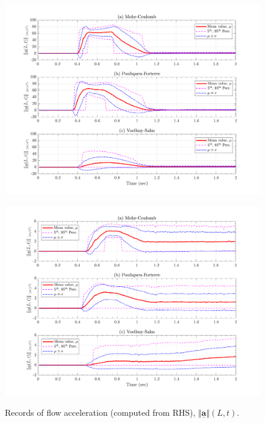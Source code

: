 \documentclass{article}
\begin{document}
\begin{figure}[H]
	\begin{minipage}[b]{0.5\linewidth}
    	\centering
    	\includegraphics[width=1\textwidth]{InclinedPlane/LocalRecords/Records/accel_L3R.png}
    	\label{fig:Ramp-L3-AccR}
	\end{minipage}
	\begin{minipage}[b]{0.5\linewidth}
		\centering
		\includegraphics[width=1\textwidth]{InclinedPlane/LocalRecords/Records/accel_L4R.png}
    	\label{fig:Ramp-L4-AccR}
    \end{minipage}
    \caption{Records of flow acceleration (computed from RHS), $\Vert \underline{\mathbf{a}} \Vert(L,t)$.}
    \label{fig:Ramp-LM-AccR}
\end{figure}
\end{document}
